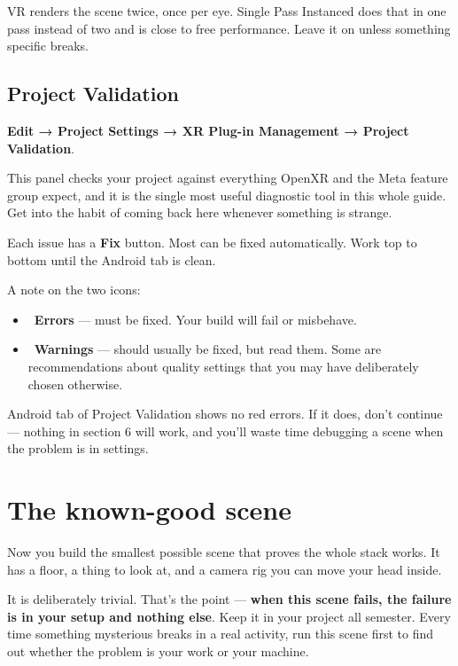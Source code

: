 \documentclass[11pt,a4paper]{article}
\providecommand{\tightlist}{\setlength{\itemsep}{2pt}\setlength{\parskip}{0pt}}
\newcommand{\errdot}{\textcolor{Red}{\faCircle}}
\newcommand{\warndot}{\textcolor{Amber}{\faCircle}}
\begin{document}
VR renders the scene twice, once per eye. Single Pass Instanced does that in one pass
instead of two and is close to free performance. Leave it on unless something specific
breaks.

\subsection{Project Validation}\label{project-validation}

\textbf{Edit → Project Settings → XR Plug-in Management → Project Validation}.

This panel checks your project against everything OpenXR and the Meta feature group
expect, and it is the single most useful diagnostic tool in this whole guide. Get into the
habit of coming back here whenever something is strange.

Each issue has a \textbf{Fix} button. Most can be fixed automatically. Work top to bottom until
the Android tab is clean.

A note on the two icons:

\begin{itemize}
\tightlist
\item
  \errdot~\textbf{Errors} --- must be fixed. Your build will fail or misbehave.
\item
  \warndot~\textbf{Warnings} --- should usually be fixed, but read them. Some are recommendations
  about quality settings that you may have deliberately chosen otherwise.
\end{itemize}

\begin{keybox}[Checkpoint]
Android tab of Project Validation shows no red errors. If it does, don't
continue --- nothing in section 6 will work, and you'll waste time debugging a scene when
the problem is in settings.
\end{keybox}


\section{The known-good scene}\label{the-known-good-scene}

Now you build the smallest possible scene that proves the whole stack works. It has a
floor, a thing to look at, and a camera rig you can move your head inside.

It is deliberately trivial. That's the point --- \textbf{when this scene fails, the failure is in
your setup and nothing else}. Keep it in your project all semester. Every time something
mysterious breaks in a real activity, run this scene first to find out whether the problem
is your work or your machine.
\end{document}
